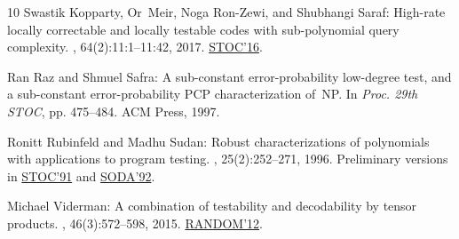 \documentclass[11pt]{article}
\numberwithin{equation}{section}
\theoremstyle{definition}
\theoremstyle{plain}
\theoremstyle{plain}
\begin{document}
\begin{thebibliography}{10}
{\sc Swastik Kopparty, Or~Meir, Noga Ron{-}Zewi, and Shubhangi Saraf}:
  High-rate locally correctable and locally testable codes with sub-polynomial
  query complexity.
, 64(2):11:1--11:42, 2017.
\newblock \prelim \href{https://doi.org/10.1145/2897518.2897523}{STOC'16}.

{\sc Ran Raz and Shmuel Safra}: A sub-constant error-probability low-degree
  test, and a sub-constant error-probability {PCP} characterization of~{NP}.
\newblock In {\em Proc. 29th STOC}, pp. 475--484. ACM Press, 1997.
\newblock [\epfmtdoi{10.1145/258533.258641}]

{\sc Ronitt Rubinfeld and Madhu Sudan}: Robust characterizations of polynomials
  with applications to program testing.
, 25(2):252--271, 1996.
\newblock Preliminary versions in
  \href{https://doi.org/10.1145/103418.103429}{STOC'91} and
  \href{https://dl.acm.org/doi/10.5555/139404.139410}{SODA'92}.
\newblock [\epfmtdoi{10.1137/S0097539793255151}]

{\sc Michael Viderman}: A combination of testability and decodability by tensor
  products.
, 46(3):572--598, 2015.
\newblock \prelim
  \href{https://doi.org/10.1007/978-3-642-32512-0\_55}{RANDOM'12}.

\end{thebibliography}
\end{document}
